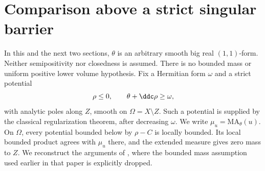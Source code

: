 \section{Comparison above a strict singular barrier}
\label{sec:big-minimal-comparison}

In this and the next two sections, $\theta$ is an arbitrary smooth big real $(1,1)$-form. Neither semipositivity nor closedness is assumed. There is no bounded mass or uniform positive lower volume hypothesis. Fix a Hermitian form $\omega$ and a strict potential
\[
 \rho\leq0,\qquad \theta+\ddc\rho\geq\omega,
\]
with analytic poles along $Z$, smooth on $\Omega=X\setminus Z$. Such a potential is supplied by the classical regularization theorem, after decreasing $\omega$. We write $\mu_u=\mathrm{MA}_\theta(u)$. On $\Omega$, every potential bounded below by $\rho-C$ is locally bounded. Its local bounded product agrees with $\mu_u$ there, and the extended measure gives zero mass to $Z$. We reconstruct the arguments of \cite[Section 4]{BGL25}, where the bounded mass assumption used earlier in that paper is explicitly dropped.

